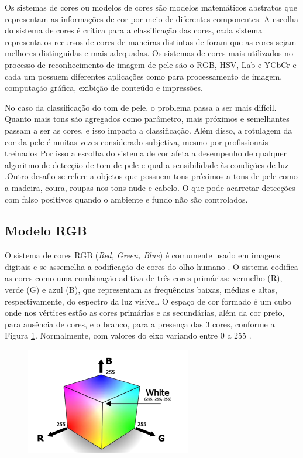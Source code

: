 Os sistemas de cores ou modelos de cores são modelos matemáticos abstratos que representam as informações de cor por meio de diferentes componentes. A escolha do sistema de cores é crítica para a classificação das cores, cada sistema representa os recursos de cores de maneiras distintas de foram que as cores sejam melhores distinguidas e mais adequadas. Os sistemas de cores mais utilizados no processo de reconhecimento de imagem de pele são o RGB, HSV, Lab e YCbCr\cite{Modelo_matematico_para_reducao} e cada um possuem diferentes aplicações como para processamento de imagem, computação gráfica, exibição de conteúdo e impressões.

No caso da classificação do tom de pele, o problema passa a ser mais difícil. Quanto mais tons são agregados como parâmetro, mais próximos e semelhantes passam a ser as cores, e isso impacta a classificação. Além disso, a rotulagem da cor da pele é muitas vezes considerado subjetiva, mesmo por profissionais treinados \cite{Automatic_Skin_Tone_Extraction_for_Visagism_Applications}
Por isso a escolha do sistema de cor afeta a desempenho de qualquer algoritmo de detecção de tom de pele e qual a sensibilidade às condições de luz \cite{Skin_detection_ashort_tutorial}.Outro desafio se refere a objetos que possuem tons próximos a tons de pele como a madeira, coura, roupas nos tons nude e cabelo. O que pode acarretar detecções com falso positivos quando o ambiente e fundo não são controlados.


\subsection{Modelo RGB}
O sistema de cores RGB (\textit{Red, Green, Blue}) é comumente usado em imagens digitais e se assemelha a codificação de cores do olho humano \cite{Visão_Computacional_Indexação_Automatizada_de_Imagens}. O sistema codifica as cores como uma combinação aditiva de três cores primárias: vermelho (R), verde (G) e azul (B), que representam as frequências baixas, médias e altas, respectivamente, do espectro da luz visível. O espaço de cor formado é um cubo onde nos vértices estão as cores primárias e as secundárias, além da cor preto, para ausência de cores, e o branco, para a presença das 3 cores, conforme a Figura \ref{fig: RGB }. Normalmente, com valores do eixo variando entre 0 a 255 \cite{Cor_Aspectos_relevantes_para_viualização_de_cor}. 

\begin{figure}[h]
\caption{}
\centering

\includegraphics[]{Template_Latex_TCC-UNIFTEC/_lib/imagens/RGB.png}

\label{fig: RGB }
\end{figure}

